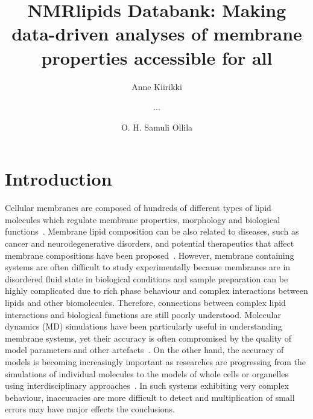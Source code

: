 \documentclass[fleqn,10pt]{wlscirep}
\title{NMRlipids Databank: Making data-driven analyses of membrane properties accessible for all}
\author[1]{Anne Kiirikki}
\author[2]{...}
\author[1,*]{O. H. Samuli Ollila}
\affil[1]{University of Helsinki, Institute of Biotechonology, Helsinki, Finland}
\affil[2]{Affiliation, department, city, postcode, country}
\affil[*]{samuli.ollila@helsinki.fi}
\begin{document}
\flushbottom
\maketitle
%
%
\thispagestyle{empty}


\section{Introduction}


Cellular membranes are composed of hundreds of different types of lipid molecules which regulate membrane properties, morphology and biological functions~\cite{vanmeer08}. Membrane lipid composition can be also related to diseases, such as cancer and neurodegenerative disorders, and potential therapeutics that affect membrane compositions have been proposed~\cite{torres21}. However, membrane containing systems are often difficult to study experimentally because membranes are in disordered fluid state in biological conditions and sample preparation can be highly complicated due to rich phase behaviour and complex interactions between lipids and other biomolecules. Therefore, connections between complex lipid interactions and biological functions are still poorly understood.
Molecular dynamics (MD) simulations have been particularly useful in understanding membrane systems, yet their accuracy is often compromised by the quality of model parameters and other artefacts~\cite{antila22b,gupta22}. 
On the  other hand, the accuracy of models is becoming increasingly important as researches are progressing from the simulations of 
individual molecules to the models of whole cells or organelles using interdisciplinary approaches~\cite{johnson15,thornburg22,gupta22}. In such systems exhibiting very complex behaviour, inaccuracies are more difficult to detect and multiplication of small errors may have major effects the conclusions.
\end{document}
